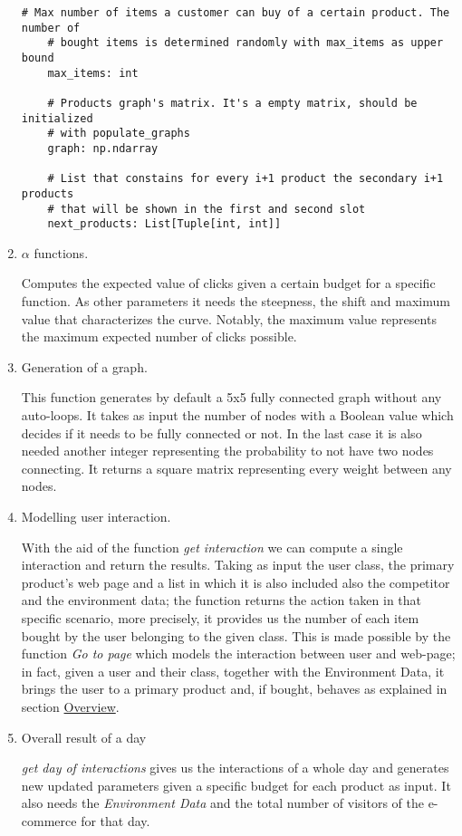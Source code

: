 \begin{enumerate}
\begin{lstlisting}[style=Python]
    # Max number of items a customer can buy of a certain product. The number of
    # bought items is determined randomly with max_items as upper bound
    max_items: int

    # Products graph's matrix. It's a empty matrix, should be initialized
    # with populate_graphs
    graph: np.ndarray

    # List that constains for every i+1 product the secondary i+1 products
    # that will be shown in the first and second slot
    next_products: List[Tuple[int, int]]
           \end{lstlisting}
           \item $\alpha$ functions.

                Computes the expected value of clicks given a certain budget for a specific function. As other parameters it needs the steepness, the shift and maximum value that characterizes the curve. Notably, the maximum value represents the maximum expected number of clicks possible.

            \item Generation of a graph.

                This function generates by default a 5x5 fully connected graph without any auto-loops. It takes as input the number of nodes with a Boolean value which decides if it needs to be fully connected or not. In the last case it is also needed another integer representing the probability to not have two nodes connecting. It returns a square matrix representing every weight between any nodes.

            \item Modelling user interaction.

                With the aid of the function \textit{get interaction} we can compute a single interaction and return the results. Taking as input the user class, the primary product's web page and a list in which it is also included also the competitor and the environment data; the function returns the action taken in that specific scenario, more precisely, it provides us the number of each item bought by the user belonging to the given class. This is made possible by the function \textit{Go to page} which models the interaction between user and web-page; in fact, given a user and their class, together with the Environment Data, it brings the user to a primary product and, if bought, behaves as explained in section \hyperref[sec:intro_overview]{Overview}.

            \item Overall result of a day

                \textit{get day of interactions} gives us the interactions of a whole day and generates new updated parameters given a specific budget for each product as input. It also needs the \textit{Environment Data} and the total number of visitors of the e-commerce for that day.
        \end{enumerate}

